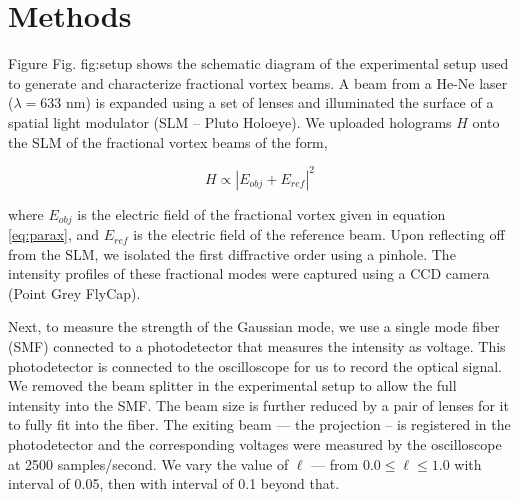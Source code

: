 \documentclass[10pt,a4paper,twoside]{article}
\renewcommand{\l}{\ell}
\renewcommand{\ref}[1]{Fig. #1}
\begin{document}

\section{Methods}\label{sec:methods}
Figure \ref{fig:setup} shows the schematic diagram of the experimental setup used to generate and characterize fractional vortex beams. A beam from a He-Ne laser ($\lambda= 633$ nm) is expanded using a set of lenses and illuminated the surface of a spatial light modulator (SLM -- Pluto Holoeye). We uploaded holograms $H$ onto the SLM of the fractional vortex beams of the form,

\begin{equation}
    H \propto {|E_{obj} + E_{ref}|}^2 
\end{equation}

\noindent where $E_{obj}$ is the electric field of the fractional vortex given in equation \eqref{eq:parax}, and $E_{ref}$ is the electric field of the reference beam. Upon reflecting off from the SLM, we isolated the first diffractive order using a pinhole. The intensity profiles of these fractional modes were captured using a CCD camera (Point Grey FlyCap). 

Next, to measure the strength of the Gaussian mode, we use a single mode fiber (SMF) connected to a photodetector that measures the intensity as voltage. This photodetector is connected to the oscilloscope for us to record the optical signal. We removed the beam splitter in the experimental setup to allow the full intensity into the SMF. The beam size is further reduced by a pair of lenses for it to fully fit into the fiber. The exiting beam --- the projection -- is registered in the photodetector and the corresponding voltages were measured by the oscilloscope at 2500 samples/second. We vary the value of $\l$ --- from $0.0 \le \l \le 1.0$ with interval of 0.05, then with interval of 0.1 beyond that. 
\end{document}
